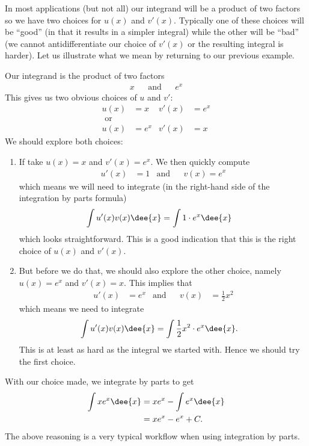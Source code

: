In most applications (but not all) our integrand will be a product of two factors so we
have two choices for $u(x)$ and $v'(x)$. Typically one of these choices will be ``good''
(in that it results in a simpler integral) while the other will be ``bad'' (we cannot
antidifferentiate our choice of $v'(x)$ or the resulting integral is harder). Let us
illustrate what we mean by returning to our previous example.
\begin{eg}
Our integrand is the product of two factors
\begin{align*}
  x && \text{and} && e^x
\end{align*}
This gives us two obvious choices of $u$ and $v'$:
\begin{align*}
  u(x)&=x & v'(x)&=e^x \\
    \text{ or}\\
  u(x)&=e^x & v'(x)&=x
\end{align*}
We should explore both choices:
\begin{enumerate}
 \item If take $u(x)=x$ and $v'(x)=e^x$. We then quickly compute
  \begin{align*}
  u'(x)&=1 &\text{and} && v(x)=e^x
 \end{align*}
  which means we will need to integrate (in the right-hand side of the integration by
parts formula)
\begin{align*}
  \int u'(x) v(x) \dee{x} &= \int 1 \cdot e^x \dee{x}
\end{align*}
  which looks straightforward. This is a good indication that this is the right choice of
$u(x)$ and $v'(x)$.
 \item But before we do that, we should also explore the other choice, namely $u(x)=e^x$
and $v'(x)=x$. This implies that
\begin{align*}
  u'(x)&= e^x &\text{and}&& v(x)&= \frac{1}{2}x^2
\end{align*}
which means we need to integrate
\begin{align*}
  \int u'(x) v(x) \dee{x} &= \int \frac{1}{2}x^2 \cdot e^x \dee{x}.
\end{align*}
  This is at least as hard as the integral we started with. Hence we should try the first
choice.
\end{enumerate}
With our choice made, we integrate by parts to get
\begin{align*}
  \int xe^x \dee{x} &= xe^x - \int e^x \dee{x} \\
  &= xe^x - e^x +C.
\end{align*}
The above reasoning is a very typical workflow when using integration by
parts.
\end{eg}
